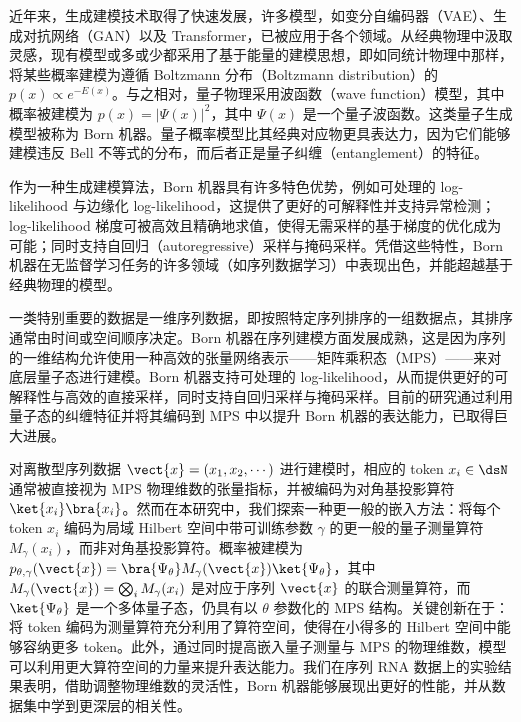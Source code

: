 近年来，生成建模技术取得了快速发展，许多模型，如变分自编码器（VAE）\cite{2013arXiv1312.6114K}、生成对抗网络（GAN）\cite{2014arXiv1406.2661G,2018PhRvA..98a2324D}以及 Transformer\cite{2017arXiv170603762V}，已被应用于各个领域。从经典物理中汲取灵感，现有模型或多或少都采用了基于能量的建模思想，即如同统计物理中那样，将某些概率建模为遵循 Boltzmann 分布（Boltzmann distribution）的 $p(x)\propto e^{-E(x)}$\cite{ackley1985learning,salakhutdinov2015learning}。与之相对，量子物理采用波函数（wave function）模型，其中概率被建模为 $p(x)=|\Psi(x)|^2$，其中 $\Psi(x)$ 是一个量子波函数。这类量子生成模型被称为 Born 机器\cite{PhysRevX.8.031012, 2022PhRvA.106b2612K, 2021arXiv211205326M}。量子概率模型比其经典对应物更具表达力，因为它们能够建模违反 Bell 不等式的分布，而后者正是量子纠缠（entanglement）的特征\cite{trueblood2012quantum,haven2016quantum}。

作为一种生成建模算法，Born 机器具有许多特色优势，例如可处理的 log-likelihood 与边缘化 log-likelihood，这提供了更好的可解释性并支持异常检测；log-likelihood 梯度可被高效且精确地求值，使得无需采样的基于梯度的优化成为可能；同时支持自回归（autoregressive）采样与掩码采样。凭借这些特性，Born 机器在无监督学习任务的许多领域（如序列数据学习）中表现出色，并能超越基于经典物理的模型\cite{2018Entrp..20..583C,2018arXiv180404168L}。

一类特别重要的数据是一维序列数据，即按照特定序列排序的一组数据点，其排序通常由时间或空间顺序决定。Born 机器在序列建模方面发展成熟，这是因为序列的一维结构允许使用一种高效的张量网络表示——矩阵乘积态（MPS）——来对底层量子态进行建模\cite{orus2019tensor,2019PhRvX...9c1041L,2021arXiv210612974L}。Born 机器支持可处理的 log-likelihood，从而提供更好的可解释性与高效的直接采样，同时支持自回归采样与掩码采样。目前的研究通过利用量子态的纠缠特征并将其编码到 MPS 中以提升 Born 机器的表达能力，已取得巨大进展\cite{2018PhRvA..98a2324D,mitarai2018quantum,2018arXiv180404168L,gong2022born,2019arXiv190300556M}。

对离散型序列数据 $\vect{x}=(x_1,x_2,\cdots)$ 进行建模时，相应的 token $x_i\in \dsN$ 通常被直接视为 MPS 物理维数的张量指标，并被编码为对角基投影算符 $\ket{x_i}\bra{x_i}$。然而在本研究中，我们探索一种更一般的嵌入方法：将每个 token $x_i$ 编码为局域 Hilbert 空间中带可训练参数 $\gamma$ 的更一般的量子测量算符 $M_{\gamma}(x_i)$，而非对角基投影算符。概率被建模为 $p_{\theta,\gamma}(\vect{x})=\bra{\Psi_\theta}M_{\gamma}(\vect{x})\ket{\Psi_\theta}$，其中 $M_\gamma(\vect{x})=\bigotimes_i M_\gamma(x_i)$ 是对应于序列 $\vect{x}$ 的联合测量算符，而 $\ket{\Psi_\theta}$ 是一个多体量子态，仍具有以 $\theta$ 参数化的 MPS 结构。关键创新在于：将 token 编码为测量算符充分利用了算符空间，使得在小得多的 Hilbert 空间中能够容纳更多 token。此外，通过同时提高嵌入量子测量与 MPS 的物理维数，模型可以利用更大算符空间的力量来提升表达能力。我们在序列 RNA 数据上的实验结果表明，借助调整物理维数的灵活性，Born 机器能够展现出更好的性能，并从数据集中学到更深层的相关性。

